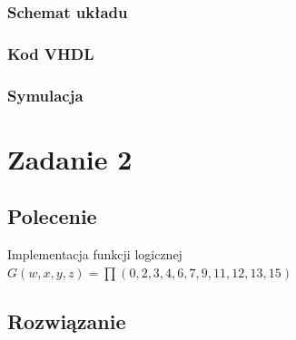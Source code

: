 \documentclass[a4paper,12pt]{extarticle}  %
\begin{document}
\subsubsection{Schemat układu}
\begin{figure}[H]
	\centering
\end{figure}
\subsubsection{Kod VHDL}

\subsubsection{Symulacja}
\begin{figure}[H]
	\centering
\end{figure}
\section{Zadanie 2}
\subsection{Polecenie}
Implementacja funkcji logicznej \textbf{$G(w,x,y,z) = \prod(0, 2, 3, 4, 6, 7, 9, 11, 12, 13, 15)$}
\subsection{Rozwiązanie}
\end{document}
